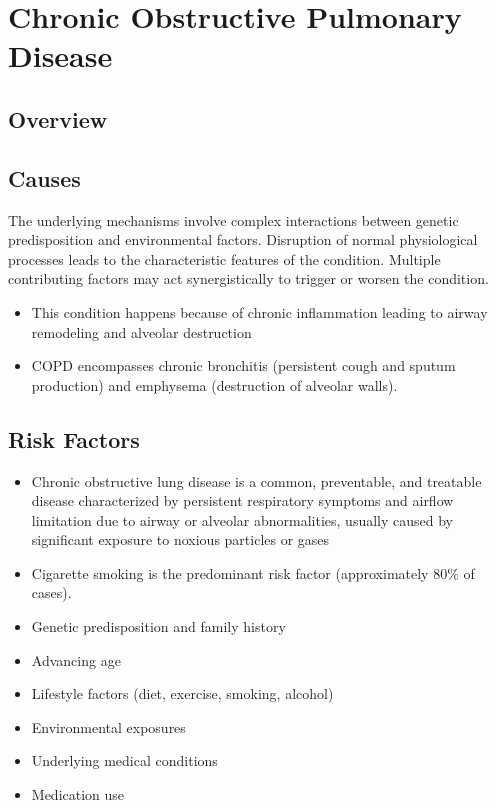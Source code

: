 \chapter{Chronic Obstructive Pulmonary Disease}
\label{sec:Chronic Obstructive Pulmonary Disease}

\section{Overview}

\section{Causes}
The underlying mechanisms involve complex interactions between genetic predisposition and environmental factors. Disruption of normal physiological processes leads to the characteristic features of the condition. Multiple contributing factors may act synergistically to trigger or worsen the condition.

\begin{itemize}[noitemsep]
  \item This condition happens because of chronic inflammation leading to airway remodeling and alveolar destruction
  \item COPD encompasses chronic bronchitis (persistent cough and sputum production) and emphysema (destruction of alveolar walls).
\end{itemize}
\section{Risk Factors}
\begin{itemize}[noitemsep]
  \item Chronic obstructive lung disease is a common, preventable, and treatable disease characterized by persistent respiratory symptoms and airflow limitation due to airway or alveolar abnormalities, usually caused by significant exposure to noxious particles or gases
  \item Cigarette smoking is the predominant risk factor (approximately 80\% of cases).
  \item Genetic predisposition and family history
  \item Advancing age
  \item Lifestyle factors (diet, exercise, smoking, alcohol)
  \item Environmental exposures
  \item Underlying medical conditions
  \item Medication use
\end{itemize}
